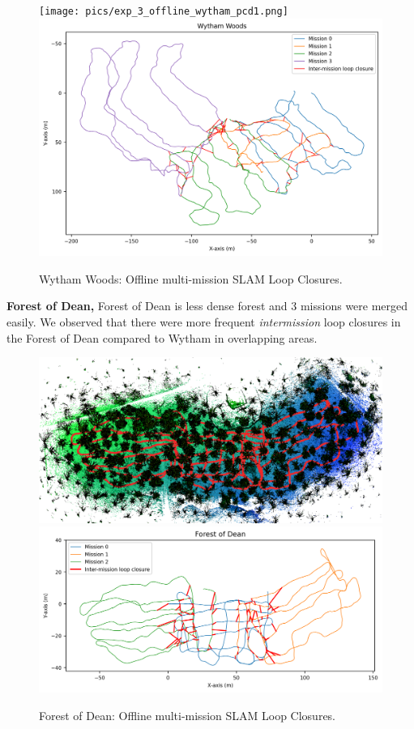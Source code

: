 \begin{figure}[htbp]
  \centering
  \texttt{[image: pics/exp\_3\_offline\_wytham\_pcd1.png]}
  \includegraphics[width=\columnwidth]{pics/exp_3_1_multimission_slam_wytham.png}
  \caption{Wytham Woods: Offline multi-mission SLAM Loop Closures.}
  \label{fig:exp_multi_mission_wytham}
\end{figure}
\newline
\textbf{Forest of Dean, }\hspace{0.5em} Forest of Dean is less dense forest and 3 missions were merged easily. We observed that there were more frequent \emph{intermission} loop closures in the Forest of Dean compared to Wytham in overlapping areas. 
\begin{figure}[htbp]
  \centering
  \includegraphics[width=\columnwidth]{pics/exp_3_offline_Dean_pcd3.png}
  \includegraphics[width=\columnwidth]{pics/exp_3_1_multimission_slam_dean.png}
  \caption{Forest of Dean: Offline multi-mission SLAM Loop Closures.}
  \label{fig:exp_multi_mission_dean}
\end{figure}
